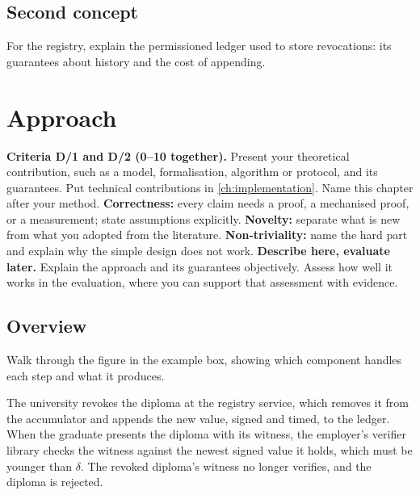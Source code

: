 \subsection{Second concept}\label{app:chapters:second-concept}
For the registry, explain the permissioned ledger used to store revocations: its guarantees about history and the cost of appending.

\section{Approach}\label{app:chapters:approach}
\textbf{Criteria D/1 and D/2 (0--10 together).} Present your theoretical contribution, such as a model, formalisation, algorithm or protocol, and its guarantees. Put technical contributions in \cref{ch:implementation}. Name this chapter after your method.
\textbf{Correctness:} every claim needs a proof, a mechanised proof, or a measurement; state assumptions explicitly.
\textbf{Novelty:} separate what is new from what you adopted from the literature.
\textbf{Non-triviality:} name the hard part and explain why the simple design does not work.
\textbf{Describe here, evaluate later.} Explain the approach and its guarantees objectively. Assess how well it works in the evaluation, where you can support that assessment with evidence.

\subsection[Overview]{Overview\skimmark}\label{app:chapters:overview}
Walk through the figure in the example box, showing which component handles each step and what it produces.
\begin{runningexample}
The university revokes the diploma at the registry service, which removes it from the accumulator and appends the new value, signed and timed, to the ledger. When the graduate presents the diploma with its witness, the employer's verifier library checks the witness against the newest signed value it holds, which must be younger than $\delta$. The revoked diploma's witness no longer verifies, and the diploma is rejected.
\end{runningexample}

